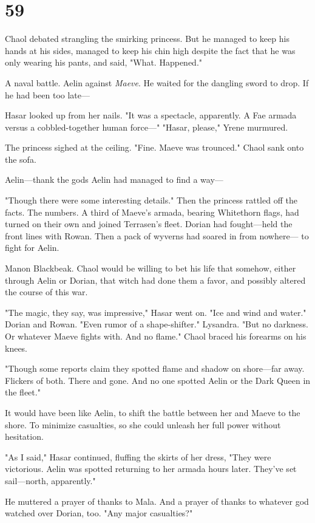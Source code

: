 
\chapter{59}

Chaol debated strangling the smirking princess.
But he managed to keep his hands at his sides, managed to keep his chin high despite the fact that he was only wearing his pants, and said, "What.
Happened."

A naval battle.
Aelin against \emph{Maeve}.
He waited for the dangling sword to drop.
If he had been too late---

Hasar looked up from her nails.
"It was a spectacle, apparently.
A Fae armada versus a cobbled-together human force---" "Hasar, please," Yrene murmured.

The princess sighed at the ceiling.
"Fine.
Maeve was trounced."
Chaol sank onto the sofa.

Aelin---thank the gods Aelin had managed to find a way---

"Though there were some interesting details."
Then the princess rattled off the facts.
The numbers.
A third of Maeve's armada, bearing Whitethorn flags, had turned on their own and joined Terrasen's fleet.
Dorian had fought---held the front lines with Rowan.
Then a pack of wyverns had soared in from nowhere--- to fight for Aelin.

Manon Blackbeak.
Chaol would be willing to bet his life that somehow, either through Aelin or Dorian, that witch had done them a favor, and possibly altered the course of this war.

"The magic, they say, was impressive," Hasar went on.
"Ice and wind and water."
Dorian and Rowan.
"Even rumor of a shape-shifter."
Lysandra.
"But no darkness.
Or whatever Maeve fights with.
And no flame."
Chaol braced his forearms on his knees.

"Though some reports claim they spotted flame and shadow on shore---far away.
Flickers of both.
There and gone.
And no one spotted Aelin or the Dark Queen in the fleet."

It would have been like Aelin, to shift the battle between her and Maeve to the shore.
To minimize casualties, so she could unleash her full power without hesitation.

"As I said," Hasar continued, fluffing the skirts of her dress, "They were victorious.
Aelin was spotted returning to her armada hours later.
They've set sail---north, apparently."

He muttered a prayer of thanks to Mala.
And a prayer of thanks to whatever god watched over Dorian, too.
"Any major casualties?"

